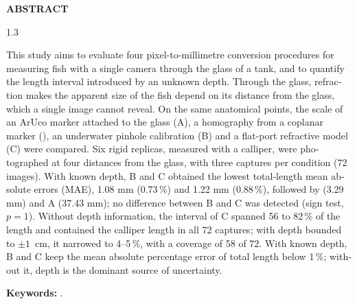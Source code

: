 \thispagestyle{plain}
\begin{center}
  {\Large\bfseries ABSTRACT}
\end{center}

\vspace{0.8\baselineskip}

\begin{spacing}{1.3}
    \begin{otherlanguage}{english}
    \justifying
    \setlength{\parskip}{6pt plus 1pt minus 1pt}
    \setlength{\parindent}{0pt}

    This study aims to evaluate four pixel-to-millimetre conversion procedures for measuring fish with a single camera through the glass of a tank, and to quantify the length interval introduced by an unknown depth. Through the glass, refraction makes the apparent size of the fish depend on its distance from the glass, which a single image cannot reveal. On the same anatomical points, the scale of an ArUco marker attached to the glass (A), a homography from a coplanar marker (\Aprime), an underwater pinhole calibration (B) and a flat-port refractive model (C) were compared. Six rigid replicas, measured with a calliper, were photographed at four distances from the glass, with three captures per condition (72 images). With known depth, B and C obtained the lowest total-length mean absolute errors (MAE), 1.08 mm (0.73\,\%) and 1.22 mm (0.88\,\%), followed by \Aprime{} (3.29 mm) and A (37.43 mm); no difference between B and C was detected (sign test, $p = 1$). Without depth information, the interval of C spanned 56 to 82\,\% of the length and contained the calliper length in all 72 captures; with depth bounded to $\pm 1$~cm, it narrowed to 4--5\,\%, with a coverage of 58 of 72. With known depth, B and C keep the mean absolute percentage error of total length below 1\,\%; without it, depth is the dominant source of uncertainty.

    \textbf{Keywords:} \Keywords.
    \end{otherlanguage}
\end{spacing}
\clearpage
